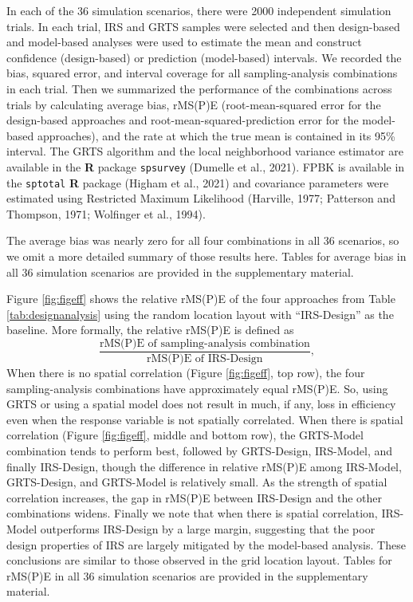 \documentclass[]{elsarticle} %
\begin{document}
In each of the 36 simulation scenarios, there were 2000 independent
simulation trials. In each trial, IRS and GRTS samples were selected and
then design-based and model-based analyses were used to estimate the
mean and construct confidence (design-based) or prediction (model-based)
intervals. We recorded the bias, squared error, and interval coverage
for all sampling-analysis combinations in each trial. Then we summarized
the performance of the combinations across trials by calculating average
bias, rMS(P)E (root-mean-squared error for the design-based approaches
and root-mean-squared-prediction error for the model-based approaches),
and the rate at which the true mean is contained in its 95\% interval.
The GRTS algorithm and the local neighborhood variance estimator are
available in the \textbf{\textsf{R}} package \texttt{spsurvey} (Dumelle
et al., 2021). FPBK is available in the \texttt{sptotal}
\textbf{\textsf{R}} package (Higham et al., 2021) and covariance
parameters were estimated using Restricted Maximum Likelihood (Harville,
1977; Patterson and Thompson, 1971; Wolfinger et al., 1994).

The average bias was nearly zero for all four combinations in all 36
scenarios, so we omit a more detailed summary of those results here.
Tables for average bias in all 36 simulation scenarios are provided in
the supplementary material.

Figure \ref{fig:figeff} shows the relative rMS(P)E of the four
approaches from Table \ref{tab:designanalysis} using the random location
layout with ``IRS-Design'' as the baseline. More formally, the relative
rMS(P)E is defined as \begin{equation*}
\frac{\text{rMS(P)E of sampling-analysis combination}}{\text{rMS(P)E of IRS-Design}},
\end{equation*} When there is no spatial correlation (Figure
\ref{fig:figeff}, top row), the four sampling-analysis combinations have
approximately equal rMS(P)E. So, using GRTS or using a spatial model
does not result in much, if any, loss in efficiency even when the
response variable is not spatially correlated. When there is spatial
correlation (Figure \ref{fig:figeff}, middle and bottom row), the
GRTS-Model combination tends to perform best, followed by GRTS-Design,
IRS-Model, and finally IRS-Design, though the difference in relative
rMS(P)E among IRS-Model, GRTS-Design, and GRTS-Model is relatively
small. As the strength of spatial correlation increases, the gap in
rMS(P)E between IRS-Design and the other combinations widens. Finally we
note that when there is spatial correlation, IRS-Model outperforms
IRS-Design by a large margin, suggesting that the poor design properties
of IRS are largely mitigated by the model-based analysis. These
conclusions are similar to those observed in the grid location layout.
Tables for rMS(P)E in all 36 simulation scenarios are provided in the
supplementary material.
\end{document}
